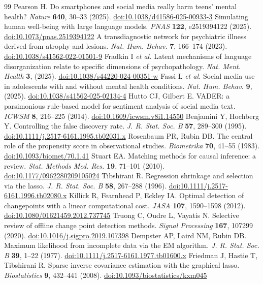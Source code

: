 \documentclass[11pt]{article}
\newcommand{\doi}[1]{\href{https://doi.org/#1}{doi:#1}}
\begin{document}
\begin{thebibliography}{99}
 Pearson H. Do smartphones and social media really harm teens' mental health? \emph{Nature} \textbf{640}, 30--33 (2025). \doi{10.1038/d41586-025-00933-3}
 Simulating human well-being with large language models. \emph{PNAS} \textbf{122}, e2519394122 (2025). \doi{10.1073/pnas.2519394122}
 A transdiagnostic network for psychiatric illness derived from atrophy and lesions. \emph{Nat. Hum. Behav.} \textbf{7}, 166--174 (2023). \doi{10.1038/s41562-022-01501-9}
 Fradkin I \emph{et al.} Latent mechanisms of language disorganization relate to specific dimensions of psychopathology. \emph{Nat. Ment. Health} \textbf{3}, (2025). \doi{10.1038/s44220-024-00351-w}
 Fassi L \emph{et al.} Social media use in adolescents with and without mental health conditions. \emph{Nat. Hum. Behav.} \textbf{9}, (2025). \doi{10.1038/s41562-025-02134-4}
 Hutto CJ, Gilbert E. VADER: a parsimonious rule-based model for sentiment analysis of social media text. \emph{ICWSM} \textbf{8}, 216--225 (2014). \doi{10.1609/icwsm.v8i1.14550}
 Benjamini Y, Hochberg Y. Controlling the false discovery rate. \emph{J. R. Stat. Soc. B} \textbf{57}, 289--300 (1995). \doi{10.1111/j.2517-6161.1995.tb02031.x}
 Rosenbaum PR, Rubin DB. The central role of the propensity score in observational studies. \emph{Biometrika} \textbf{70}, 41--55 (1983). \doi{10.1093/biomet/70.1.41}
 Stuart EA. Matching methods for causal inference: a review. \emph{Stat. Methods Med. Res.} \textbf{19}, 71--101 (2010). \doi{10.1177/0962280209105024}
 Tibshirani R. Regression shrinkage and selection via the lasso. \emph{J. R. Stat. Soc. B} \textbf{58}, 267--288 (1996). \doi{10.1111/j.2517-6161.1996.tb02080.x}
 Killick R, Fearnhead P, Eckley IA. Optimal detection of changepoints with a linear computational cost. \emph{JASA} \textbf{107}, 1590--1598 (2012). \doi{10.1080/01621459.2012.737745}
 Truong C, Oudre L, Vayatis N. Selective review of offline change point detection methods. \emph{Signal Processing} \textbf{167}, 107299 (2020). \doi{10.1016/j.sigpro.2019.107398}
 Dempster AP, Laird NM, Rubin DB. Maximum likelihood from incomplete data via the EM algorithm. \emph{J. R. Stat. Soc. B} \textbf{39}, 1--22 (1977). \doi{10.1111/j.2517-6161.1977.tb01600.x}
 Friedman J, Hastie T, Tibshirani R. Sparse inverse covariance estimation with the graphical lasso. \emph{Biostatistics} \textbf{9}, 432--441 (2008). \doi{10.1093/biostatistics/kxm045}

\end{thebibliography}
\end{document}
